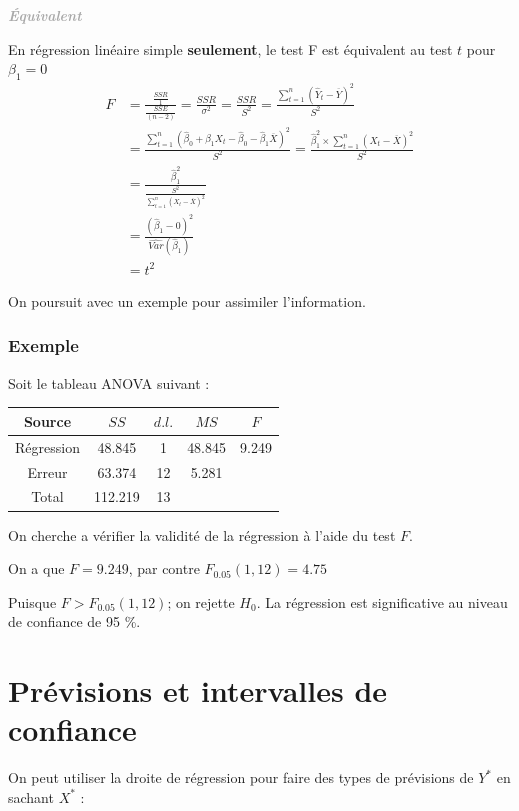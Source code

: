 \documentclass[11pt,french]{report}
\newenvironment{moreInfo}[1]
	{\begin{mdframed}
	\textcolor{darkgray}{\huge \raisebox{-3.5pt}{\faInfo} 
	\hspace{0.5cm} \large\bfseries #1}\\[5pt]
	\normalsize
	\makebox[0.1\textwidth][l]{}	
	\begin{minipage}{10cm}}
	{	\end{minipage}
	\end{mdframed}}
\begin{document}
\begin{moreInfo}{\emph{Équivalent}}
\label{equivalent}
	En régression linéaire simple \textbf{seulement}, le test F est équivalent au test $t$ pour $\beta_1 = 0$
	\begin{align*}
	F &= \frac{\frac{SSR}{1}}{\frac{SSE}{(n-2)}} = \frac{SSR}{\sigma^2} = \frac{SSR}{S^2} = \frac{\displaystyle\sum_{t=1}^n (\hat{Y}_t - \overline{Y})^2}{S^2} \\
	&= \frac{\displaystyle\sum_{t=1}^n(\hat{\beta}_0 + \hat{\beta}_1X_t - \hat{\beta}_0 - \hat{\beta}_1\overline{X})^2}{S^2} = \frac{\hat{\beta}_1^2 \times \displaystyle\sum_{t=1}^n(X_t - \overline{X})^2}{S^2} \\
	&= \frac{\hat{\beta}_1^2}{\frac{S^2}{\displaystyle\sum_{t=1}^n(X_t - \overline{X})^2}} \\
	&= \frac{(\hat{\beta}_1 - 0)^2}{\widehat{Var}(\hat{\beta}_1)} \\
	&= t^2
	\end{align*}
\end{moreInfo}

\bigskip
On poursuit avec un exemple pour assimiler l'information.

\subsubsection*{Exemple}
Soit le tableau ANOVA suivant :
\begin{center}
\begin{tabular}{|c|c|c|c|c|}
\hline
Source & $SS$ & $d.l.$ & $MS$ & $F$ \\
\hline
Régression & 48.845 & 1 & 48.845 & 9.249 \\
Erreur & 63.374 & 12 & 5.281 & \\
\hline
Total & 112.219 & 13 & & \\
\hline
\end{tabular}
\end{center}
On cherche a vérifier la validité de la régression à l'aide du test $F$. \newline

On a que $F = 9.249$, par contre $F_{0.05}(1, 12) = 4.75$ \newline

Puisque $F>F_{0.05}(1, 12)$; on rejette $H_0$. La régression est significative au niveau de confiance de 95 \%. \newline


\section{Prévisions et intervalles de confiance}
On peut utiliser la droite de régression pour faire des types de prévisions de $Y^*$ en sachant $X^*$ :
\end{document}
